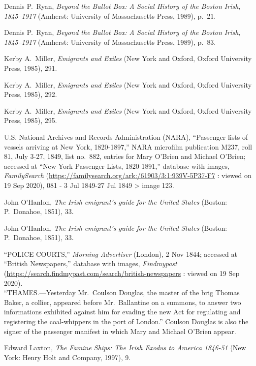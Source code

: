 \begin{thebibliography}{999}
	Dennis P.\ Ryan, \textit{Beyond the Ballot Box: A Social History of the Boston Irish, 1845--1917} (Amherst: University of Massachusetts Press, 1989), p.\ 21.
	
	Dennis P.\ Ryan, \textit{Beyond the Ballot Box: A Social History of the Boston Irish, 1845--1917} (Amherst: University of Massachusetts Press, 1989), p.\ 83.
	
	Kerby A.\ Miller, \textit{Emigrants and Exiles} (New York and Oxford, Oxford University Press, 1985), 291.
	
	Kerby A.\ Miller, \textit{Emigrants and Exiles} (New York and Oxford, Oxford University Press, 1985), 292.
	
	Kerby A.\ Miller, \textit{Emigrants and Exiles} (New York and Oxford, Oxford University Press, 1985), 295.
	
	U.S. National Archives and Records Administration (NARA), ``Passenger lists of vessels arriving at New York, 1820-1897,'' NARA microfilm publication M237, roll 81, July 3-27, 1849, list no.\ 882, entries for Mary O'Brien and Michael O'Brien; accessed at ``New York Passenger Lists, 1820-1891,'' database with images, \textit{FamilySearch} (\url{https://familysearch.org/ark:/61903/3:1:939V-5P37-F7} : viewed on 19 Sep 2020), 081 - 3 Jul 1849-27 Jul 1849 > image 123.
	
	John O'Hanlon, \textit{The Irish emigrant's guide for the United States} (Boston: P.\ Donahoe, 1851), 33.
	
	John O'Hanlon, \textit{The Irish emigrant's guide for the United States} (Boston: P.\ Donahoe, 1851), 33.
	
	``POLICE COURTS,'' \textit{Morning Advertiser} (London), 2 Nov 1844; accessed at ``British Newspapers,'' database with images, \textit{Findmypast} (\url{https://search.findmypast.com/search/british-newspapers} : viewed on 19 Sep 2020).\\
	``THAMES.---Yesterday Mr.\ Coulson Douglas, the master of the brig Thomas Baker, a collier, appeared before Mr.\ Ballantine on a summons, to answer two informations exhibited against him for evading the new Act for regulating and registering the coal-whippers in the port of London.'' Coulson Douglas is also the signer of the passenger manifest in which Mary and Michael O'Brien appear.
	
	Edward Laxton, \textit{The Famine Ships: The Irish Exodus to America 1846-51} (New York: Henry Holt and Company, 1997), 9. 
	

\end{thebibliography}
